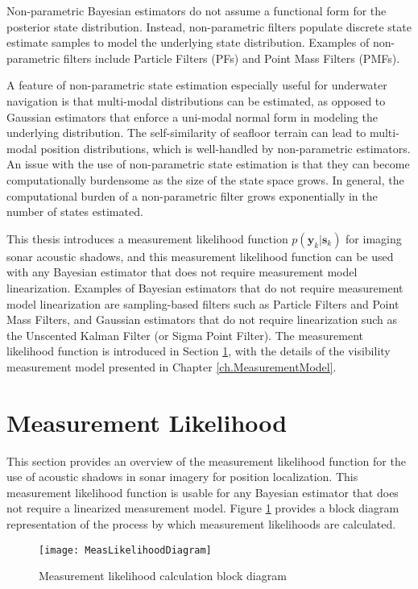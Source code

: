 Non-parametric Bayesian estimators do not assume a functional form for the posterior state distribution.
Instead, non-parametric filters populate discrete state estimate samples to model the underlying state distribution.
Examples of non-parametric filters include Particle Filters (PFs) and Point Mass Filters (PMFs).

A feature of non-parametric state estimation especially useful for underwater navigation is that multi-modal distributions can be estimated, as opposed to Gaussian estimators that enforce a uni-modal normal form in modeling the underlying distribution.
The self-similarity of seafloor terrain can lead to multi-modal position distributions, which is well-handled by non-parametric estimators.
An issue with the use of non-parametric state estimation is that they can become computationally burdensome as the size of the state space grows.
In general, the computational burden of a non-parametric filter grows exponentially in the number of states estimated.

This thesis introduces a measurement likelihood function $p(\mathbf{y}_k | \mathbf{s}_k)$ for imaging sonar acoustic shadows, and this measurement likelihood function can be used with any Bayesian estimator that does not require measurement model linearization.
Examples of Bayesian estimators that do not require measurement model linearization are sampling-based filters such as Particle Filters and Point Mass Filters, and Gaussian estimators that do not require linearization such as the Unscented Kalman Filter (or Sigma Point Filter).
The measurement likelihood function is introduced in Section \ref{framework.Measurement}, with the details of the visibility measurement model presented in Chapter \ref{ch.MeasurementModel}.

\section{Measurement Likelihood}
\label{framework.Measurement}

This section provides an overview of the measurement likelihood function for the use of acoustic shadows in sonar imagery for position localization.
This measurement likelihood function is usable for any Bayesian estimator that does not require a linearized measurement model.
Figure \ref{fig:measLikeBlock} provides a block diagram representation of the process by which measurement likelihoods are calculated.

\begin{figure}[!h]
	\centering
		\texttt{[image: MeasLikelihoodDiagram]}
	\caption{Measurement likelihood calculation block diagram}
	\label{fig:measLikeBlock}
\end{figure}

